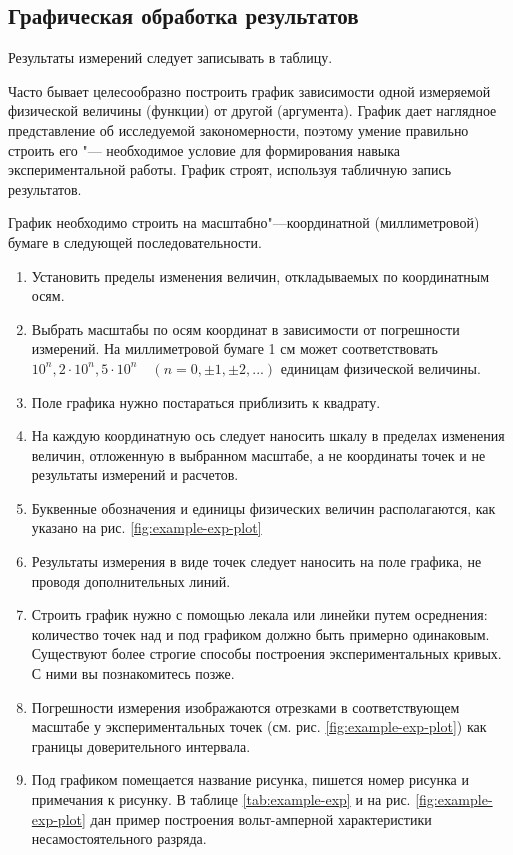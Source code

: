 \documentclass[a4paper, 12pt]{extarticle}
\begin{document}
\subsection{Графическая обработка результатов}

Результаты измерений следует записывать в таблицу.

Часто бывает целесообразно построить график зависимости одной измеряемой физической величины (функции) от другой (аргумента). График дает наглядное представление об исследуемой закономерности, поэтому умение правильно строить его "--- необходимое условие для формирования навыка экспериментальной работы. График строят, используя табличную запись результатов.

График необходимо строить на масштабно"---координатной (миллиметровой) бумаге в следующей последовательности.

\begin{enumerate}
  \item Установить пределы изменения величин, откладываемых по координатным осям.
  \item  Выбрать масштабы по осям координат в зависимости от погрешности измерений. На миллиметровой бумаге 1 см может соответствовать $10^n, 2\cdot10^n, 5\cdot10^n \quad (n = 0, \pm 1, \pm 2, ...)$ единицам физической величины.
  \item Поле графика нужно постараться приблизить к квадрату.
  \item На каждую координатную ось следует наносить шкалу в пределах изменения величин, отложенную в выбранном масштабе, а не координаты точек и не результаты измерений и расчетов.
  \item Буквенные обозначения и единицы физических величин располагаются, как указано на рис. \ref{fig:example-exp-plot}
  \item Результаты измерения в виде точек следует наносить на поле графика, не проводя дополнительных линий.
  \item Строить график нужно с помощью лекала или линейки путем осреднения: количество точек над и под графиком должно быть примерно одинаковым. Существуют более строгие способы построения экспериментальных кривых. С ними вы познакомитесь позже.
  \item Погрешности измерения изображаются отрезками в соответствующем масштабе у экспериментальных точек (см. рис. \ref{fig:example-exp-plot}) как границы доверительного интервала.
  \item Под графиком помещается название рисунка, пишется номер рисунка и примечания к рисунку. В таблице \ref{tab:example-exp} и на рис. \ref{fig:example-exp-plot} дан пример построения вольт-амперной характеристики несамостоятельного разряда.
\end{enumerate}
\end{document}
